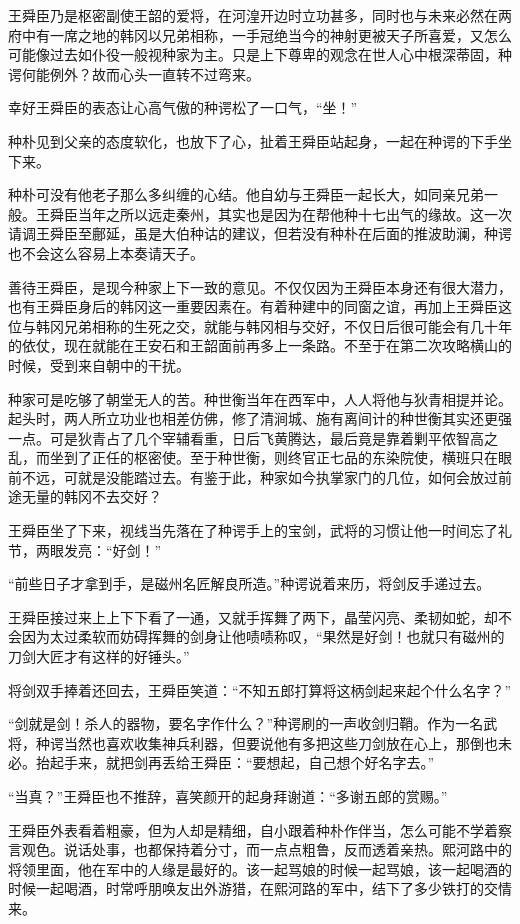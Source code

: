 王舜臣乃是枢密副使王韶的爱将，在河湟开边时立功甚多，同时也与未来必然在两府中有一席之地的韩冈以兄弟相称，一手冠绝当今的神射更被天子所喜爱，又怎么可能像过去如仆役一般视种家为主。只是上下尊卑的观念在世人心中根深蒂固，种谔何能例外？故而心头一直转不过弯来。

幸好王舜臣的表态让心高气傲的种谔松了一口气，“坐！”

种朴见到父亲的态度软化，也放下了心，扯着王舜臣站起身，一起在种谔的下手坐下来。

种朴可没有他老子那么多纠缠的心结。他自幼与王舜臣一起长大，如同亲兄弟一般。王舜臣当年之所以远走秦州，其实也是因为在帮他种十七出气的缘故。这一次请调王舜臣至鄜延，虽是大伯种诂的建议，但若没有种朴在后面的推波助澜，种谔也不会这么容易上本奏请天子。

善待王舜臣，是现今种家上下一致的意见。不仅仅因为王舜臣本身还有很大潜力，也有王舜臣身后的韩冈这一重要因素在。有着种建中的同窗之谊，再加上王舜臣这位与韩冈兄弟相称的生死之交，就能与韩冈相与交好，不仅日后很可能会有几十年的依仗，现在就能在王安石和王韶面前再多上一条路。不至于在第二次攻略横山的时候，受到来自朝中的干扰。

种家可是吃够了朝堂无人的苦。种世衡当年在西军中，人人将他与狄青相提并论。起头时，两人所立功业也相差仿佛，修了清涧城、施有离间计的种世衡其实还更强一点。可是狄青占了几个宰辅看重，日后飞黄腾达，最后竟是靠着剿平侬智高之乱，而坐到了正任的枢密使。至于种世衡，则终官正七品的东染院使，横班只在眼前不远，可就是没能踏过去。有鉴于此，种家如今执掌家门的几位，如何会放过前途无量的韩冈不去交好？

王舜臣坐了下来，视线当先落在了种谔手上的宝剑，武将的习惯让他一时间忘了礼节，两眼发亮：“好剑！”

“前些日子才拿到手，是磁州名匠解良所造。”种谔说着来历，将剑反手递过去。

王舜臣接过来上上下下看了一通，又就手挥舞了两下，晶莹闪亮、柔韧如蛇，却不会因为太过柔软而妨碍挥舞的剑身让他啧啧称叹，“果然是好剑！也就只有磁州的刀剑大匠才有这样的好锤头。”

将剑双手捧着还回去，王舜臣笑道：“不知五郎打算将这柄剑起来起个什么名字？”

“剑就是剑！杀人的器物，要名字作什么？”种谔刷的一声收剑归鞘。作为一名武将，种谔当然也喜欢收集神兵利器，但要说他有多把这些刀剑放在心上，那倒也未必。抬起手来，就把剑再丢给王舜臣：“要想起，自己想个好名字去。”

“当真？”王舜臣也不推辞，喜笑颜开的起身拜谢道：“多谢五郎的赏赐。”

王舜臣外表看着粗豪，但为人却是精细，自小跟着种朴作伴当，怎么可能不学着察言观色。说话处事，也都保持着分寸，而一点点粗鲁，反而透着亲热。熙河路中的将领里面，他在军中的人缘是最好的。该一起骂娘的时候一起骂娘，该一起喝酒的时候一起喝酒，时常呼朋唤友出外游猎，在熙河路的军中，结下了多少铁打的交情来。

